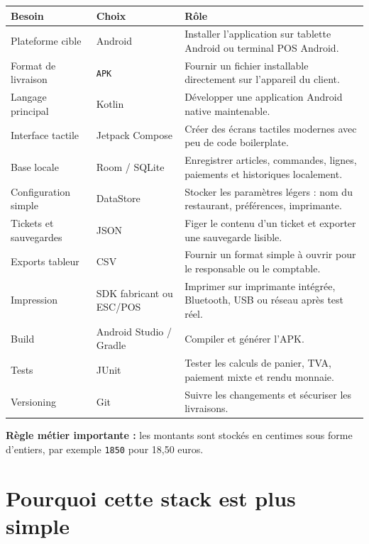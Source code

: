 \documentclass[11pt,a4paper]{article}
\begin{document}
\begin{tabularx}{\textwidth}{L{3.55cm} L{3.45cm} Y}
  \toprule
  \color{white}\textbf{Besoin} &
  \color{white}\textbf{Choix} &
  \color{white}\textbf{Rôle} \\
  \midrule
  Plateforme cible &
  Android &
  Installer l'application sur tablette Android ou terminal POS Android. \\
  Format de livraison &
  \texttt{APK} &
  Fournir un fichier installable directement sur l'appareil du client. \\
  Langage principal &
  Kotlin &
  Développer une application Android native maintenable. \\
  Interface tactile &
  Jetpack Compose &
  Créer des écrans tactiles modernes avec peu de code boilerplate. \\
  Base locale &
  Room / SQLite &
  Enregistrer articles, commandes, lignes, paiements et historiques localement. \\
  Configuration simple &
  DataStore &
  Stocker les paramètres légers : nom du restaurant, préférences, imprimante. \\
  Tickets et sauvegardes &
  JSON &
  Figer le contenu d'un ticket et exporter une sauvegarde lisible. \\
  Exports tableur &
  CSV &
  Fournir un format simple à ouvrir pour le responsable ou le comptable. \\
  Impression &
  SDK fabricant ou ESC/POS &
  Imprimer sur imprimante intégrée, Bluetooth, USB ou réseau après test réel. \\
  Build &
  Android Studio / Gradle &
  Compiler et générer l'APK. \\
  Tests &
  JUnit &
  Tester les calculs de panier, TVA, paiement mixte et rendu monnaie. \\
  Versioning &
  Git &
  Suivre les changements et sécuriser les livraisons. \\
  \bottomrule
\end{tabularx}

\vspace{5pt}
\textbf{Règle métier importante :} les montants sont stockés en centimes sous forme d'entiers,
par exemple \texttt{1850} pour 18,50 euros.

\section{Pourquoi cette stack est plus simple}
\end{document}
